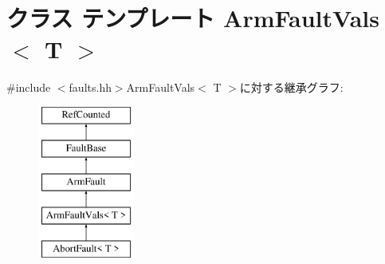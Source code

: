 \hypertarget{classArmISA_1_1ArmFaultVals}{
\section{クラス テンプレート ArmFaultVals$<$ T $>$}
\label{classArmISA_1_1ArmFaultVals}
}


{\ttfamily \#include $<$faults.hh$>$}ArmFaultVals$<$ T $>$に対する継承グラフ:\begin{figure}[H]
\begin{center}
\leavevmode
\includegraphics[height=5cm]{classArmISA_1_1ArmFaultVals}
\end{center}
\end{figure}
